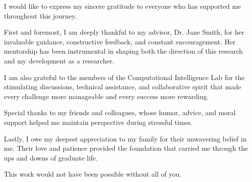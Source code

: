 I would like to express my sincere gratitude to everyone who has supported me throughout this journey. 

First and foremost, I am deeply thankful to my advisor, Dr. Jane Smith, for her invaluable guidance, constructive feedback, and constant encouragement. Her mentorship has been instrumental in shaping both the direction of this research and my development as a researcher.

I am also grateful to the members of the Computational Intelligence Lab for the stimulating discussions, technical assistance, and collaborative spirit that made every challenge more manageable and every success more rewarding.

Special thanks to my friends and colleagues, whose humor, advice, and moral support helped me maintain perspective during stressful times. 

Lastly, I owe my deepest appreciation to my family for their unwavering belief in me. Their love and patience provided the foundation that carried me through the ups and downs of graduate life.

This work would not have been possible without all of you.